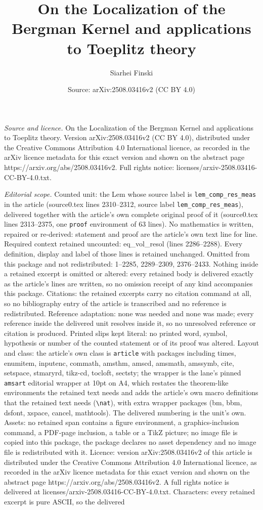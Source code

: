 \documentclass[10pt,a4paper]{amsart}
\title[On the Localization of the Bergman Kernel and applications t]{On the Localization of the Bergman Kernel and applications to Toeplitz theory}
\author{Siarhei Finski}
\date{Source: arXiv:2508.03416v2 (CC BY 4.0)}
\begin{document}
\maketitle

\noindent\emph{Source and licence.} On the Localization of the Bergman Kernel and applications to Toeplitz theory. Version arXiv:2508.03416v2 (CC BY 4.0), distributed under the Creative Commons Attribution 4.0 International licence, as recorded in the arXiv licence metadata for this exact version and shown on the abstract page https://arxiv.org/abs/2508.03416v2. Full rights notice: licenses/arxiv-2508.03416-CC-BY-4.0.txt.\par\smallskip

\noindent\textit{Editorial scope.} Counted unit: the Lem whose source label is \texttt{lem\_comp\_res\_meas} in the article (source0.tex lines 2310--2312, source label \texttt{lem\_comp\_res\_meas}), delivered together with the article's own complete original proof of it (source0.tex lines 2313--2375, one \texttt{proof} environment of 63 lines). No mathematics is written, repaired or re-derived: statement and proof are the article's own text line for line. Required context retained uncounted: eq\_vol\_resol (lines 2286--2288). Every definition, display and label of those lines is retained unchanged. Omitted from this package and not redistributed: 1--2285, 2289--2309, 2376--2433. Nothing inside a retained excerpt is omitted or altered: every retained body is delivered exactly as the article's lines are written, so no omission receipt of any kind accompanies this package. Citations: the retained excerpts carry no citation command at all, so no bibliography entry of the article is transcribed and no reference is redistributed. Reference adaptation: none was needed and none was made; every reference inside the delivered unit resolves inside it, so no unresolved reference or citation is produced. Printed slips kept literal: no printed word, symbol, hypothesis or number of the counted statement or of its proof was altered. Layout and class: the article's own class is \texttt{article} with packages including times, enumitem, inputenc, commath, amsthm, amscd, amsmath, amssymb, cite, setspace, stmaryrd, tikz-cd, tocloft, sectsty; the wrapper is the lane's pinned \texttt{amsart} editorial wrapper at 10pt on A4, which restates the theorem-like environments the retained text needs and adds the article's own macro definitions that the retained text needs (\texttt{\textbackslash nat}), with extra wrapper packages (bm, bbm, dsfont, xspace, cancel, mathtools). The delivered numbering is the unit's own. Assets: no retained span contains a figure environment, a graphics-inclusion command, a PDF-page inclusion, a table or a TikZ picture; no image file is copied into this package, the package declares no asset dependency and no image file is redistributed with it. Licence: version arXiv:2508.03416v2 of this article is distributed under the Creative Commons Attribution 4.0 International licence, as recorded in the arXiv licence metadata for this exact version and shown on the abstract page https://arxiv.org/abs/2508.03416v2. A full rights notice is delivered at licenses/arxiv-2508.03416-CC-BY-4.0.txt. Characters: every retained excerpt is pure ASCII, so the delivered 
\end{document}
